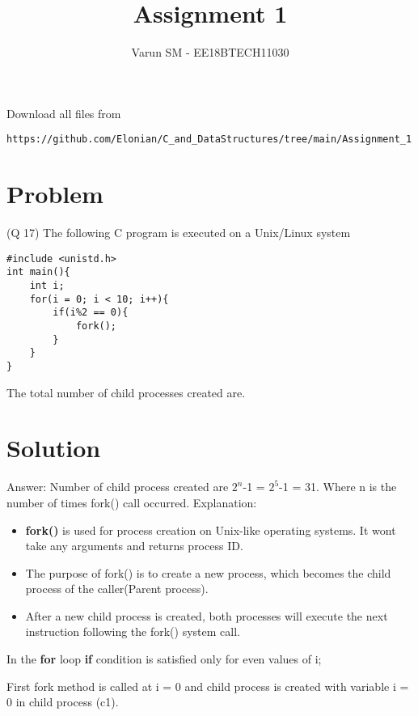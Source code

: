 \documentclass[journal,12pt,twocolumn]{IEEEtran}
\begin{document}
     \def\rightbox#1{\makebox[0in][r]{#1}}
     \def\centbox#1{\makebox[0in]{#1}}
     \def\topbox#1{\raisebox{-\baselineskip}[0in][0in]{#1}}
     \def\midbox#1{\raisebox{-0.5\baselineskip}[0in][0in]{#1}}
\vspace{3cm}
\title{Assignment 1}
\author{Varun SM - EE18BTECH11030}
\maketitle
\newpage
\bigskip
\renewcommand{\thefigure}{\theenumi}
\renewcommand{\thetable}{\theenumi}
Download all files from 
%
\begin{lstlisting}
https://github.com/Elonian/C_and_DataStructures/tree/main/Assignment_1
\end{lstlisting}
\section{Problem}
(Q 17) The following C program is executed on a Unix/Linux system
\begin{lstlisting}
#include <unistd.h>
int main(){
    int i;
    for(i = 0; i < 10; i++){
        if(i%2 == 0){
            fork();
        }
    }
}
\end{lstlisting}
The total number of child processes created are.

\section{Solution}
Answer: 
Number of child process created are ${2^{n}}$-1 = ${2^{5}}$-1 = 31.
Where n is the number of times fork() call occurred.
\newline
Explanation:
\begin{itemize}
    \item \textbf{fork()} is used for process creation on Unix-like operating systems. It wont take any arguments and returns process ID. 
    \item The purpose of fork() is to create a new process, which becomes the child process of the caller(Parent process).
    \item After a new child process is created, both processes will execute the next instruction following the fork() system call.
\end{itemize}

In the \textbf{for} loop \textbf{if} condition is satisfied only for even values of i;

First fork method is called at i = 0 and child process is created with variable i = 0 in child process (c1).
\end{document}
